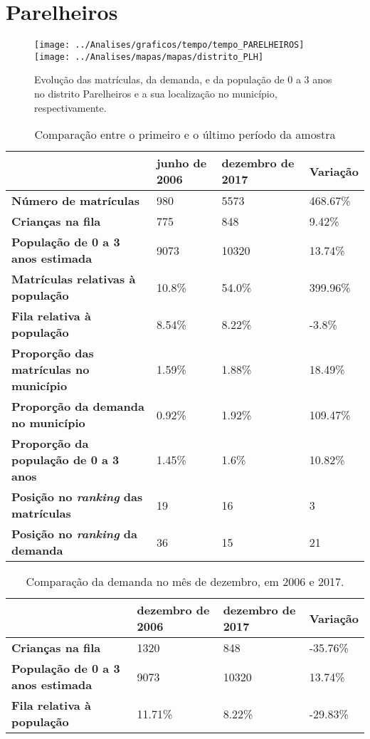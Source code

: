 \section{Parelheiros}
\begin{figure}[H]
	\centering
	\texttt{[image: ../Analises/graficos/tempo/tempo\_PARELHEIROS]}
	\texttt{[image: ../Analises/mapas/mapas/distrito\_PLH]}
	\caption{Evolução das matrículas, da demanda, e da população de 0 a 3 anos no distrito Parelheiros e a sua localização no município, respectivamente.}
\end{figure}
\begin{table}[H]
	\begin{tabular}{|l|l|l|l|}
		\hline
		\textbf{}                                      & \textbf{junho de 2006}       & \textbf{dezembro de 2017}    & \textbf{Variação} \\ \hline
		\textbf{Número de matrículas}                  & 980 & 5573 & 468.67\% \\ \hline
		\textbf{Crianças na fila}                      & 775 & 848 & 9.42\% \\ \hline
		\textbf{População de 0 a 3 anos estimada}      & 9073 & 10320 & 13.74\% \\ \hline
		\textbf{Matrículas relativas à população}      & 10.8\% & 54.0\% & 399.96\% \\ \hline
		\textbf{Fila relativa à população}             & 8.54\% & 8.22\% & -3.8\% \\ \hline
		\textbf{Proporção das matrículas no município} & 1.59\% & 1.88\% & 18.49\% \\ \hline
		\textbf{Proporção da demanda no município}     & 0.92\% & 1.92\% & 109.47\% \\ \hline
		\textbf{Proporção da população de 0 a 3 anos}  & 1.45\% & 1.6\% & 10.82\% \\ \hline
		\textbf{Posição no \textit{ranking} das matrículas}     & 19 & 16 & 3 \\ \hline
		\textbf{Posição no \textit{ranking} da demanda}         & 36 & 15 & 21 \\ \hline
	\end{tabular}
	\caption{Comparação entre o primeiro e o último período da amostra}
\end{table}
\begin{table}[H]
	\begin{tabular}{|l|l|l|l|}
		\hline
		\textbf{}                                 & \textbf{dezembro de 2006} & \textbf{dezembro de 2017} & \textbf{Variação} \\ \hline
		\textbf{Crianças na fila}                      & 1320 & 848 & -35.76\% \\ \hline
		\textbf{População de 0 a 3 anos estimada}      & 9073 & 10320 & 13.74\% \\ \hline
		\textbf{Fila relativa à população}             & 11.71\% & 8.22\% & -29.83\% \\ \hline
	\end{tabular}
	\caption{Comparação da demanda no mês de dezembro, em 2006 e 2017.}
\end{table}
